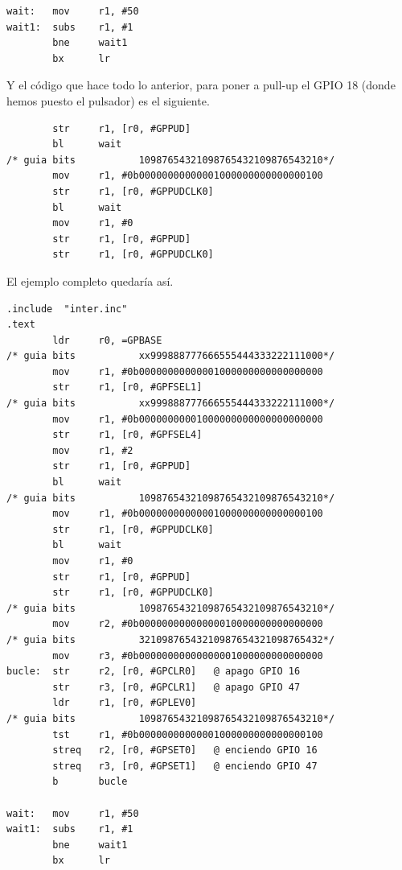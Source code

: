 \begin{lstlisting}
wait:   mov     r1, #50
wait1:  subs    r1, #1
        bne     wait1
        bx      lr
\end{lstlisting}

Y el código que hace todo lo anterior, para poner a pull-up el GPIO 18 (donde hemos puesto
el pulsador) es el siguiente.

\begin{lstlisting}
        str     r1, [r0, #GPPUD]
        bl      wait
/* guia bits           10987654321098765432109876543210*/
        mov     r1, #0b00000000000001000000000000000100
        str     r1, [r0, #GPPUDCLK0]
        bl      wait
        mov     r1, #0
        str     r1, [r0, #GPPUD]
        str     r1, [r0, #GPPUDCLK0]
\end{lstlisting}

El ejemplo completo quedaría así.

\begin{lstlisting}[caption={apend2.s},label={lst:codigoApendice_2}]
        .include  "inter.inc"
.text
        ldr     r0, =GPBASE
/* guia bits           xx999888777666555444333222111000*/
        mov     r1, #0b00000000000001000000000000000000
        str     r1, [r0, #GPFSEL1]
/* guia bits           xx999888777666555444333222111000*/
        mov     r1, #0b00000000001000000000000000000000
        str     r1, [r0, #GPFSEL4]
        mov     r1, #2
        str     r1, [r0, #GPPUD]
        bl      wait
/* guia bits           10987654321098765432109876543210*/
        mov     r1, #0b00000000000001000000000000000100
        str     r1, [r0, #GPPUDCLK0]
        bl      wait
        mov     r1, #0
        str     r1, [r0, #GPPUD]
        str     r1, [r0, #GPPUDCLK0]
/* guia bits           10987654321098765432109876543210*/
        mov     r2, #0b00000000000000010000000000000000
/* guia bits           32109876543210987654321098765432*/
        mov     r3, #0b00000000000000001000000000000000
bucle:  str     r2, [r0, #GPCLR0]   @ apago GPIO 16
        str     r3, [r0, #GPCLR1]   @ apago GPIO 47
        ldr     r1, [r0, #GPLEV0]
/* guia bits           10987654321098765432109876543210*/
        tst     r1, #0b00000000000001000000000000000100
        streq   r2, [r0, #GPSET0]   @ enciendo GPIO 16
        streq   r3, [r0, #GPSET1]   @ enciendo GPIO 47
        b       bucle

wait:   mov     r1, #50
wait1:  subs    r1, #1
        bne     wait1
        bx      lr
\end{lstlisting}

